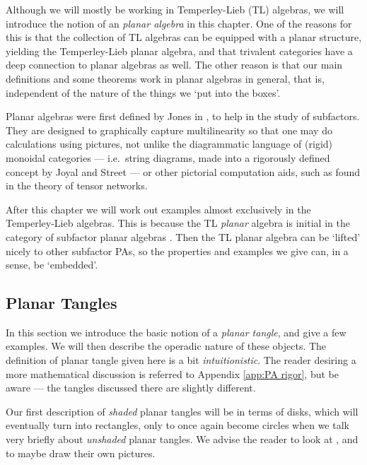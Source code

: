 Although we will mostly be working in Temperley-Lieb (TL) algebras, we will introduce the notion of an \emph{planar algebra} in this chapter. One of the reasons for this is that the collection of TL algebras can be equipped with a planar structure, yielding the Temperley-Lieb planar algebra, and that trivalent categories have a deep connection to planar algebras as well. The other reason is that our main definitions and some theorems work in planar algebras in general, that is, independent of the nature of the things we `put into the boxes'.

Planar algebras were first defined by Jones in \cite{jones1999planar1}, to help in the study of subfactors. They are designed to graphically capture multilinearity so that one may do calculations using pictures, not unlike the diagrammatic language of (rigid) monoidal categories --- i.e.\ string diagrams, made into a rigorously defined concept by Joyal and Street \cite{joyal1991geometry} --- or other pictorial computation aids, such as found in the theory of tensor networks.

After this chapter we will work out examples almost exclusively in the Temperley-Lieb algebras. This is because the TL \emph{planar} algebra is initial in the category of subfactor planar algebras \cite{peters2010planar}. Then the TL planar algebra can be `lifted' nicely to other subfactor PAs, so the properties and examples we give can, in a sense, be `embedded'.

\subsection{Planar Tangles}
In this section we introduce the basic notion of a \emph{planar tangle}, and give a few examples. We will then describe the operadic nature of these objects. The definition of planar tangle given here is a bit \emph{intuitionistic}. The reader desiring a more mathematical discussion is referred to \textsf{Appendix \ref{app:PA rigor}}, but be aware --- the tangles discussed there are slightly different.

Our first description of \emph{shaded} planar tangles will be in terms of disks, which will eventually turn into rectangles, only to once again become circles when we talk very briefly about \emph{unshaded} planar tangles. We advise the reader to look at , and to maybe draw their own pictures.

